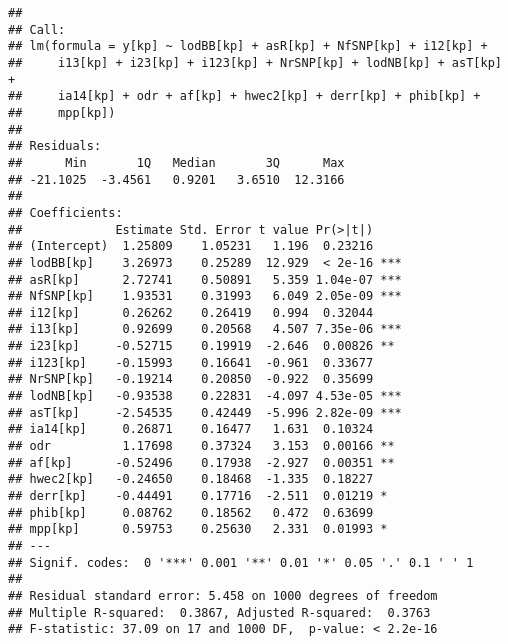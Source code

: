 \documentclass[]{article}
\newenvironment{Shaded}{\begin{snugshade}}{\end{snugshade}}
\newcommand{\KeywordTok}[1]{\textcolor[rgb]{0.13,0.29,0.53}{\textbf{#1}}}
\newcommand{\DecValTok}[1]{\textcolor[rgb]{0.00,0.00,0.81}{#1}}
\newcommand{\StringTok}[1]{\textcolor[rgb]{0.31,0.60,0.02}{#1}}
\newcommand{\OperatorTok}[1]{\textcolor[rgb]{0.81,0.36,0.00}{\textbf{#1}}}
\newcommand{\NormalTok}[1]{#1}
\begin{document}
\begin{Shaded}
\end{Shaded}

\begin{verbatim}
## 
## Call:
## lm(formula = y[kp] ~ lodBB[kp] + asR[kp] + NfSNP[kp] + i12[kp] + 
##     i13[kp] + i23[kp] + i123[kp] + NrSNP[kp] + lodNB[kp] + asT[kp] + 
##     ia14[kp] + odr + af[kp] + hwec2[kp] + derr[kp] + phib[kp] + 
##     mpp[kp])
## 
## Residuals:
##      Min       1Q   Median       3Q      Max 
## -21.1025  -3.4561   0.9201   3.6510  12.3166 
## 
## Coefficients:
##             Estimate Std. Error t value Pr(>|t|)    
## (Intercept)  1.25809    1.05231   1.196  0.23216    
## lodBB[kp]    3.26973    0.25289  12.929  < 2e-16 ***
## asR[kp]      2.72741    0.50891   5.359 1.04e-07 ***
## NfSNP[kp]    1.93531    0.31993   6.049 2.05e-09 ***
## i12[kp]      0.26262    0.26419   0.994  0.32044    
## i13[kp]      0.92699    0.20568   4.507 7.35e-06 ***
## i23[kp]     -0.52715    0.19919  -2.646  0.00826 ** 
## i123[kp]    -0.15993    0.16641  -0.961  0.33677    
## NrSNP[kp]   -0.19214    0.20850  -0.922  0.35699    
## lodNB[kp]   -0.93538    0.22831  -4.097 4.53e-05 ***
## asT[kp]     -2.54535    0.42449  -5.996 2.82e-09 ***
## ia14[kp]     0.26871    0.16477   1.631  0.10324    
## odr          1.17698    0.37324   3.153  0.00166 ** 
## af[kp]      -0.52496    0.17938  -2.927  0.00351 ** 
## hwec2[kp]   -0.24650    0.18468  -1.335  0.18227    
## derr[kp]    -0.44491    0.17716  -2.511  0.01219 *  
## phib[kp]     0.08762    0.18562   0.472  0.63699    
## mpp[kp]      0.59753    0.25630   2.331  0.01993 *  
## ---
## Signif. codes:  0 '***' 0.001 '**' 0.01 '*' 0.05 '.' 0.1 ' ' 1
## 
## Residual standard error: 5.458 on 1000 degrees of freedom
## Multiple R-squared:  0.3867, Adjusted R-squared:  0.3763 
## F-statistic: 37.09 on 17 and 1000 DF,  p-value: < 2.2e-16
\end{verbatim}
\end{document}
